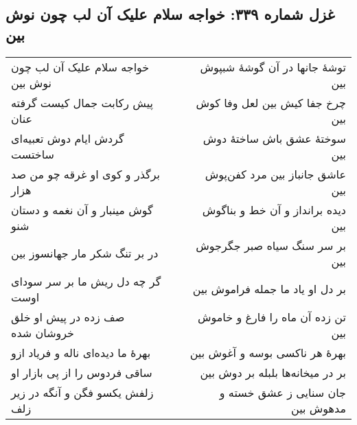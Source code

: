 \begin{center}
\section*{غزل شماره ۳۳۹: خواجه سلام علیک آن لب چون نوش بین}
\label{sec:339}
\begin{longtable}{l p{0.5cm} r}
خواجه سلام علیک آن لب چون نوش بین
&&
توشهٔ جانها در آن گوشهٔ شبپوش بین
\\
پیش رکابت جمال کیست گرفته عنان
&&
چرخ جفا کیش بین لعل وفا کوش بین
\\
گردش ایام دوش تعبیه‌ای ساختست
&&
سوختهٔ عشق باش ساختهٔ دوش بین
\\
برگذر و کوی او غرقه چو من صد هزار
&&
عاشق جانباز بین مرد کفن‌پوش بین
\\
گوش مینبار و آن نغمه و دستان شنو
&&
دیده برانداز و آن خط و بناگوش بین
\\
در بر تنگ شکر مار جهانسوز بین
&&
بر سر سنگ سیاه صبر جگرجوش بین
\\
گر چه دل ریش ما بر سر سودای اوست
&&
بر دل او یاد ما جمله فراموش بین
\\
صف زده در پیش او خلق خروشان شده
&&
تن زده آن ماه را فارغ و خاموش بین
\\
بهرهٔ ما دیده‌ای ناله و فریاد ازو
&&
بهرهٔ هر ناکسی بوسه و آغوش بین
\\
ساقی فردوس را از پی بازار او
&&
بر در میخانه‌ها بلبله بر دوش بین
\\
زلفش یکسو فگن و آنگه در زیر زلف
&&
جان سنایی ز عشق خسته و مدهوش بین
\\
\end{longtable}
\end{center}

